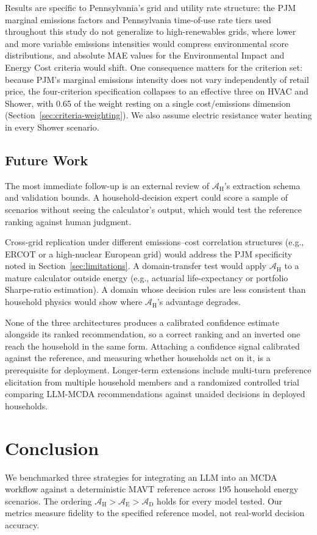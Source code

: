 \documentclass[final,3p,times]{elsarticle}
\begin{document}
Results are specific to Pennsylvania's grid and utility rate structure: the PJM marginal emissions factors and Pennsylvania time-of-use rate tiers used throughout this study do not generalize to high-renewables grids, where lower and more variable emissions intensities would compress environmental score distributions, and absolute MAE values for the Environmental Impact and Energy Cost criteria would shift. One consequence matters for the criterion set: because PJM's marginal emissions intensity does not vary independently of retail price, the four-criterion specification collapses to an effective three on HVAC and Shower, with 0.65 of the weight resting on a single cost/emissions dimension (Section~\ref{sec:criteria-weighting}). We also assume electric resistance water heating in every Shower scenario.

\FloatBarrier
\subsection{Future Work}
\label{sec:futurework}
The most immediate follow-up is an external review of $\mathcal{A}_{\text{H}}$'s extraction schema and validation bounds. A household-decision expert could score a sample of scenarios without seeing the calculator's output, which would test the reference ranking against human judgment.

Cross-grid replication under different emissions--cost correlation structures (e.g., ERCOT or a high-nuclear European grid) would address the PJM specificity noted in Section~\ref{sec:limitations}. A domain-transfer test would apply $\mathcal{A}_{\text{H}}$ to a mature calculator outside energy (e.g., actuarial life-expectancy or portfolio Sharpe-ratio estimation). A domain whose decision rules are less consistent than household physics would show where $\mathcal{A}_{\text{H}}$'s advantage degrades.

None of the three architectures produces a calibrated confidence estimate alongside its ranked recommendation, so a correct ranking and an inverted one reach the household in the same form. Attaching a confidence signal calibrated against the reference, and measuring whether households act on it, is a prerequisite for deployment. Longer-term extensions include multi-turn preference elicitation from multiple household members and a randomized controlled trial comparing LLM-MCDA recommendations against unaided decisions in deployed households.

\FloatBarrier
\section{Conclusion}
\label{sec:conclusion}
We benchmarked three strategies for integrating an LLM into an MCDA workflow against a deterministic MAVT reference across 195 household energy scenarios. The ordering $\mathcal{A}_{\text{H}} > \mathcal{A}_{\text{E}} > \mathcal{A}_{\text{D}}$ holds for every model tested. Our metrics measure fidelity to the specified reference model, not real-world decision accuracy.
\end{document}

